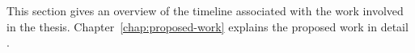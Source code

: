 This section gives an overview of the timeline associated with the work involved
in the thesis. Chapter~\ref{chap:proposed-work} explains the proposed work in 
detail .
